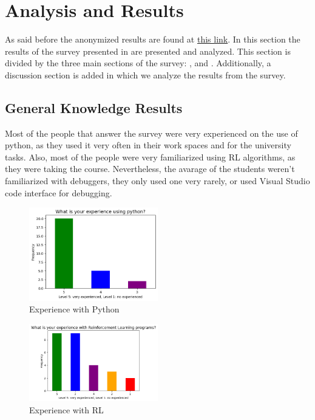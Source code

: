 
\chapter{Analysis and Results}
\label{cha:results}
As said before the anonymized results are found at \href{https://uniandes-my.sharepoint.com/:x:/g/personal/la_rodriguez_uniandes_edu_co/ESDy89Q-PgVBpYHEZ_CDh_IBhjhS35VFqNrlEjVw_ShY1w?e=lm319K}{this link}.
In this section the results of the survey presented in  are presented and analyzed. This section 
is divided by the three main sections of the survey: ,  and 
. Additionally, a discussion  section is added in which we analyze the results 
from the survey.

\section{General Knowledge Results}
\label{sec:general-knowledge}
Most of the people that answer the survey were very experienced on the use of python, as they used it very often in 
their work spaces and for the university tasks. Also, most of the people were very familiarized using \ac{RL} algorithms,
as they were taking the course. Nevertheless, the avarage of the students weren't familiarized with 
debuggers, they only used one very rarely, or used Visual Studio code interface for debugging.

\begin{figure}[h]
    \centering
    \includegraphics[width=0.5\textwidth]{figures/experience-python.png}
    \caption{Experience with Python}
    \label{fig:exp-py}
\end{figure}

\begin{figure}[h]
    \centering
    \includegraphics[width=0.5\textwidth]{figures/experience-rl.png}
    \caption{Experience with RL}
    \label{fig:exp-rl}
\end{figure}

